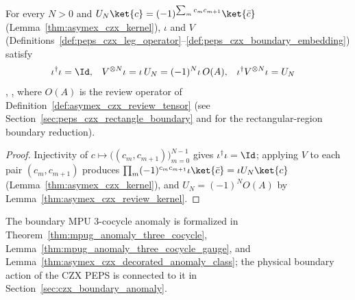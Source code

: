 \begin{lemma}%
    \label{thm:peps_czx_boundary_mpu}
    \leanok
    For every $N>0$ and $U_N\ket{c}=(-1)^{\sum_m c_m c_{m+1}}\ket{\bar c}$
    (Lemma~\ref{thm:asymex_czx_kernel}), $\iota$ and $V$
    (Definitions~\ref{def:peps_czx_leg_operator}--\ref{def:peps_czx_boundary_embedding})
    satisfy
    \begin{align}
        \iota^\dagger\iota               & = \Id,                            &
        V^{\otimes N}\iota               & = \iota\,U_N = (-1)^N\iota\,O(A), &
        \iota^\dagger V^{\otimes N}\iota & = U_N
        \notag
    \end{align}
    \cite[Appendix~A, ``The CZX MPU'']{Cirac2021Matrix},
    \cite{ChenLiuWen2011CZX}, where $O(A)$ is the review operator of
    Definition~\ref{def:asymex_czx_review_tensor} (see
    Section~\ref{sec:peps_czx_rectangle_boundary} and
    \cite{gap:rmp_peps_czx_boundary_chain} for the rectangular-region boundary
    reduction).
\end{lemma}

\begin{proof}\leanok
    Injectivity of $c\mapsto\bigl((c_m,c_{m+1})\bigr)_{m=0}^{N-1}$ gives
    $\iota^\dagger\iota=\Id$; applying $V$ to each pair $(c_m,c_{m+1})$ produces
    $\prod_m(-1)^{c_mc_{m+1}}\iota\ket{\bar c}=\iota U_N\ket{c}$
    (Lemma~\ref{thm:asymex_czx_kernel}), and $U_N=(-1)^N O(A)$ by
    Lemma~\ref{thm:asymex_czx_review_kernel}.
\end{proof}

The boundary MPU 3-cocycle anomaly is formalized in
Theorem~\ref{thm:mpug_anomaly_three_cocycle}, Lemma~\ref{thm:mpug_anomaly_three_cocycle_gauge}, and Lemma~\ref{thm:asymex_czx_decorated_anomaly_class};
the physical boundary action of the CZX PEPS is connected to it in
Section~\ref{sec:czx_boundary_anomaly}.





